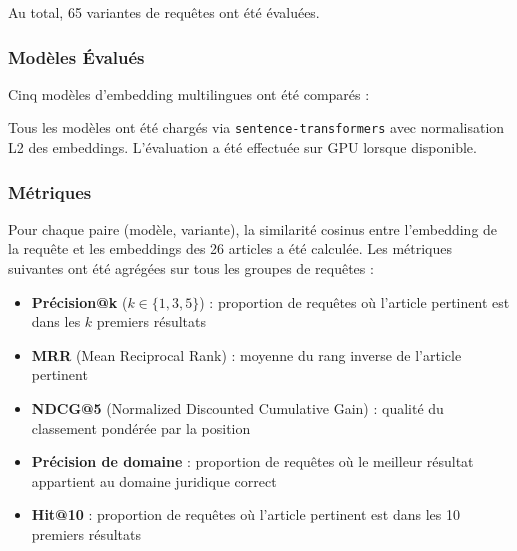 Au total, 65 variantes de requêtes ont été évaluées.

\subsubsection{Modèles Évalués}

Cinq modèles d'embedding multilingues ont été comparés :

\begin{table}[H]
\centering
\caption{Modèles d'embedding évalués}
\end{table}

Tous les modèles ont été chargés via \texttt{sentence-transformers} avec
normalisation L2 des embeddings. L'évaluation a été effectuée sur GPU
lorsque disponible.

\subsubsection{Métriques}

Pour chaque paire (modèle, variante), la similarité cosinus entre
l'embedding de la requête et les embeddings des 26 articles a été calculée.
Les métriques suivantes ont été agrégées sur tous les groupes de requêtes :

\begin{itemize}
    \item \textbf{Précision@k} ($k \in \{1,3,5\}$) : proportion de requêtes
    où l'article pertinent est dans les $k$ premiers résultats
    \item \textbf{MRR} (Mean Reciprocal Rank) : moyenne du rang inverse de
    l'article pertinent
    \item \textbf{NDCG@5} (Normalized Discounted Cumulative Gain) : qualité
    du classement pondérée par la position
    \item \textbf{Précision de domaine} : proportion de requêtes où le
    meilleur résultat appartient au domaine juridique correct
    \item \textbf{Hit@10} : proportion de requêtes où l'article pertinent
    est dans les 10 premiers résultats
\end{itemize}

